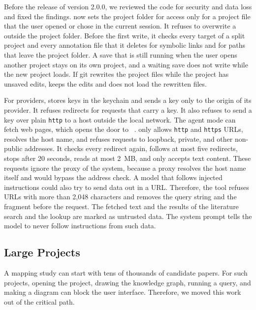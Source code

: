 Before the release of version 2.0.0, we reviewed the code for security and data loss and fixed the findings.
\SaiLoR now sets the project folder for \PDF access only for a project file that the user opened or chose in the current session.
It refuses to overwrite a \PDF outside the project folder.
Before the first write, it checks every target of a split project and every annotation file that it deletes for symbolic links and for paths that leave the project folder.
A save that is still running when the user opens another project stays on its own project, and a waiting save does not write while the new project loads.
If git rewrites the project files while the project has unsaved edits, \SaiLoR keeps the edits and does not load the rewritten files.

For \LLM providers, \SaiLoR stores \API keys in the keychain and sends a key only to the origin of its provider.
It refuses redirects for requests that carry a key.
It also refuses to send a key over plain \texttt{http} to a host outside the local network.
The agent mode can fetch web pages, which opens the door to \SSRF~\cite{owasp_ssrf}.
\SaiLoR only allows \texttt{http} and \texttt{https} URLs, resolves the host name, and refuses requests to loopback, private, and other non-public addresses.
It checks every redirect again, follows at most five redirects, stops after 20 seconds, reads at most 2~MB, and only accepts text content.
These requests ignore the proxy of the system, because a proxy resolves the host name itself and would bypass the address check.
A model that follows injected instructions could also try to send data out in a URL.
Therefore, the tool refuses URLs with more than 2,048 characters and removes the query string and the fragment before the request.
The fetched text and the results of the literature search and the \DOI lookup are marked as untrusted data.
The system prompt tells the model to never follow instructions from such data.

\subsection{Large Projects}\label{sec:architecture-scale}

A mapping study can start with tens of thousands of candidate papers.
For such projects, opening the project, drawing the knowledge graph, running a query, and making a diagram can block the user interface.
Therefore, we moved this work out of the critical path.

